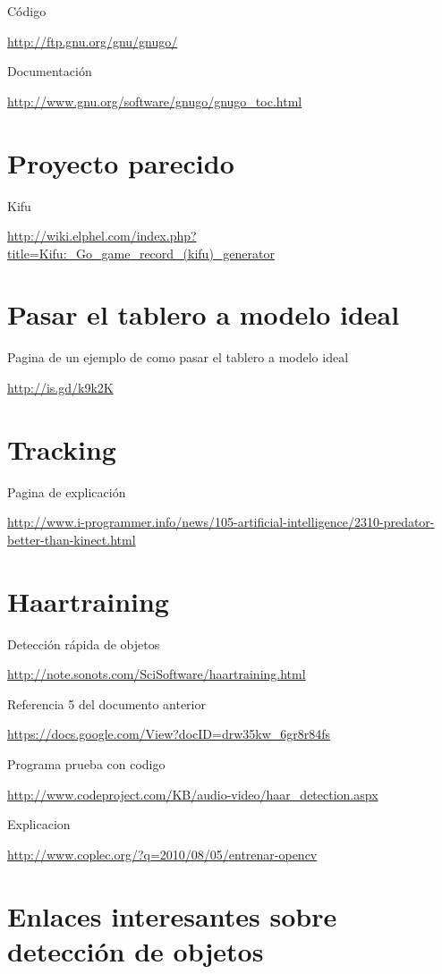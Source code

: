 \documentclass[12pt,a4paper]{report}
\begin{document}
Código

\url{http://ftp.gnu.org/gnu/gnugo/}

Documentación

\url{http://www.gnu.org/software/gnugo/gnugo_toc.html}

\section{Proyecto parecido}

Kifu

\url{http://wiki.elphel.com/index.php?title=Kifu:_Go_game_record_(kifu)_generator}

\section{Pasar el tablero a modelo ideal}

Pagina de un ejemplo de como pasar el tablero a modelo ideal

\url{http://is.gd/k9k2K}


\section{Tracking }

Pagina de explicación

\url{http://www.i-programmer.info/news/105-artificial-intelligence/2310-predator-better-than-kinect.html}

\section{Haartraining}

Detección rápida de objetos

\url{http://note.sonots.com/SciSoftware/haartraining.html}

Referencia 5 del documento anterior

\url{https://docs.google.com/View?docID=drw35kw_6gr8r84fs}

Programa prueba con codigo

\url{http://www.codeproject.com/KB/audio-video/haar_detection.aspx}

Explicacion

\url{http://www.coplec.org/?q=2010/08/05/entrenar-opencv}

\section{Enlaces interesantes sobre detección de objetos}
\end{document}
